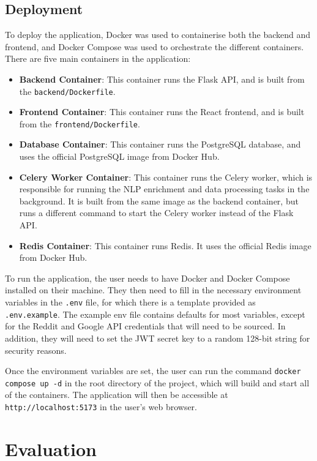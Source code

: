 \documentclass[12pt, a4paper]{article}
\begin{document}
\subsection{Deployment}
To deploy the application, Docker was used to containerise both the backend and frontend, and Docker Compose was used to orchestrate the different containers. There are five main containers in the application:
\begin{itemize}
    \item \textbf{Backend Container}: This container runs the Flask API, and is built from the \texttt{backend/Dockerfile}.
    \item \textbf{Frontend Container}: This container runs the React frontend, and is built from the \texttt{frontend/Dockerfile}.
    \item \textbf{Database Container}: This container runs the PostgreSQL database, and uses the official PostgreSQL image from Docker Hub.
    \item \textbf{Celery Worker Container}: This container runs the Celery worker, which is responsible for running the NLP enrichment and data processing tasks in the background. It is built from the same image as the backend container, but runs a different command to start the Celery worker instead of the Flask API.
    \item \textbf{Redis Container}: This container runs Redis. It uses the official Redis image from Docker Hub.
\end{itemize}

To run the application, the user needs to have Docker and Docker Compose installed on their machine. They then need to fill in the necessary environment variables in the \texttt{.env} file, for which there is a template provided as \texttt{.env.example}. The example env file contains defaults for most variables, except for the Reddit and Google API credentials that will need to be sourced. In addition, they will need to set the JWT secret key to a random 128-bit string for security reasons.

Once the environment variables are set, the user can run the command \texttt{docker compose up -d} in the root directory of the project, which will build and start all of the containers. The application will then be accessible at \texttt{http://localhost:5173} in the user's web browser.

\newpage
\section{Evaluation}
\end{document}
